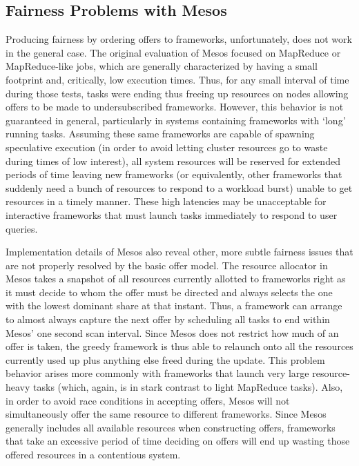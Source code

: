 \subsection{Fairness Problems with Mesos}
Producing fairness by ordering offers to frameworks, unfortunately, does not work in the general case. The original evaluation of Mesos focused on MapReduce or MapReduce-like jobs, which are generally characterized by having a small footprint and, critically, low execution times. Thus, for any small interval of time during those tests, tasks were ending thus freeing up resources on nodes allowing offers to be made to undersubscribed frameworks. However, this behavior is not guaranteed in general, particularly in systems containing frameworks with `long' running tasks. Assuming these same frameworks are capable of spawning speculative execution (in order to avoid letting cluster resources go to waste during times of low interest), all system resources will be reserved for extended periods of time leaving new frameworks (or equivalently, other frameworks that suddenly need a bunch of resources to respond to a workload burst) unable to get resources in a timely manner. These high latencies may be unacceptable for interactive frameworks that must launch tasks immediately to respond to user queries.

Implementation details of Mesos also reveal other, more subtle fairness issues that are not properly resolved by the basic offer model. The resource allocator in Mesos takes a snapshot of all resources currently allotted to frameworks right as it must decide to whom the offer must be directed and always selects the one with the lowest dominant share at that instant. Thus, a framework can arrange to almost always capture the next offer by scheduling all tasks to end within Mesos' one second scan interval. Since Mesos does not restrict how much of an offer is taken, the greedy framework is thus able to relaunch onto all the resources currently used up plus anything else freed during the update. This problem behavior arises more commonly with frameworks that launch very large resource-heavy tasks (which, again, is in stark contrast to light MapReduce tasks). Also, in order to avoid race conditions in accepting offers, Mesos will not simultaneously offer the same resource to different frameworks. Since Mesos generally includes all available resources when constructing offers, frameworks that take an excessive period of time deciding on offers will end up wasting those offered resources in a contentious system.

